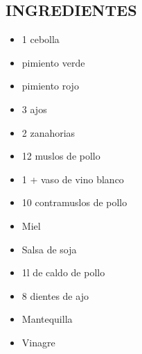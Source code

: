
\subsection*{INGREDIENTES}
\begin{itemize}
    \item 1 cebolla
    \item {} pimiento verde
    \item {} pimiento rojo
    \item 3 ajos
    \item 2 zanahorias
    \item 12 muslos de pollo
    \item 1 +  vaso de vino blanco
    \item 10 contramuslos de pollo
    \item Miel
    \item Salsa de soja
    \item 1l de caldo de pollo
    \item 8 dientes de ajo
    \item Mantequilla
    \item Vinagre
\end{itemize}

